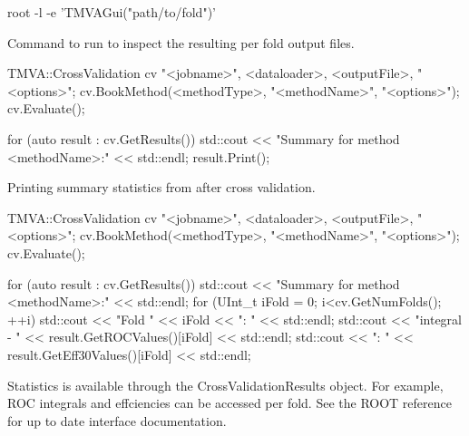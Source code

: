 \begin{codeexample}
\begin{tmvacode}
root -l -e 'TMVAGui("path/to/fold")'
\end{tmvacode}
\caption[.]{\codeexampleCaptionSize Command to run to inspect the resulting per fold output files.}
\label{code:cv-gui-fold}
\end{codeexample}

\begin{codeexample}
\begin{tmvacode}
TMVA::CrossValidation cv {"<jobname>", <dataloader>, <outputFile>, "<options>"};
cv.BookMethod(<methodType>, "<methodName>", "<options>");
cv.Evaluate();

for (auto result : cv.GetResults()) {
   std::cout << "Summary for method <methodName>:" << std::endl;
   result.Print();
}
\end{tmvacode}
\caption[.]{\codeexampleCaptionSize Printing summary statistics from after cross validation.}
\label{code:cv-results}
\end{codeexample}

\begin{codeexample}
\begin{tmvacode}
TMVA::CrossValidation cv {"<jobname>", <dataloader>, <outputFile>, "<options>"};
cv.BookMethod(<methodType>, "<methodName>", "<options>");
cv.Evaluate();

for (auto result : cv.GetResults()) {
   std::cout << "Summary for method <methodName>:" << std::endl;
   for (UInt_t iFold = 0; i<cv.GetNumFolds(); ++i) {
      std::cout << "Fold " << iFold << ": " << std::endl;
      std::cout << "\tROC integral - " << result.GetROCValues()[iFold] << std::endl;
      std::cout << ": " << result.GetEff30Values()[iFold] << std::endl;
   }
}
\end{tmvacode}
\caption[.]{\codeexampleCaptionSize Statistics is available through the CrossValidationResults object. For example, ROC integrals and effciencies can be accessed per fold. See the ROOT reference for up to date interface documentation.}
\label{code:cv-results}
\end{codeexample}


















